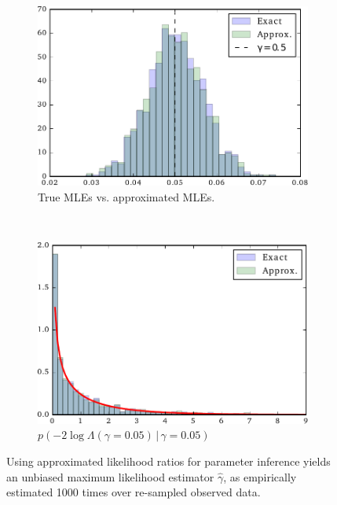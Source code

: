 \documentclass[12pt]{article}
\numberwithin{equation}{section}
\theoremstyle{plain}
\begin{document}
\begin{figure}
    \centering

    \begin{subfigure}[t]{0.45\textwidth}
        \includegraphics[width=\textwidth]{figures/fig2a.pdf}
        \caption{True MLEs vs. approximated MLEs.}
        \label{fig:2a}
    \end{subfigure}
    ~ %
    \begin{subfigure}[t]{0.45\textwidth}
        \includegraphics[width=\textwidth]{figures/fig2b.pdf}
        \caption{$p(-2 \log \Lambda(\gamma=0.05) \, | \, \gamma=0.05)$}
        \label{fig:2b}
    \end{subfigure}

    \caption{Using approximated likelihood ratios for parameter inference yields an unbiased maximum likelihood estimator
            $\hat \gamma$, as empirically estimated 1000 times over re-sampled observed data.}
    \label{fig:2}
\end{figure}
\end{document}
